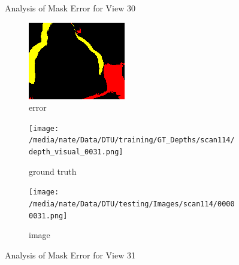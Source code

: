 \documentclass{article}
\begin{document}
\begin{figure}
\begin{subfigure}{0.3\textwidth}
		\label{fig:img30}
	\end{subfigure}
	\hfill
	\caption{Analysis of Mask Error for View 30}
	\label{fig:error_analys30}
\end{figure}\begin{figure}
	\centering
	\begin{subfigure}{0.3\textwidth}
		\centering
		\includegraphics[width=\textwidth]{./output/031_error.png}
		\caption{error}
		\label{fig:error31}
	\end{subfigure}
	\hfill
	\centering
	\begin{subfigure}{0.3\textwidth}
		\centering
		\texttt{[image: /media/nate/Data/DTU/training/GT\_Depths/scan114/depth\_visual\_0031.png]}
		\caption{ground truth}
		\label{fig:gt31}
	\end{subfigure}
	\hfill
	\centering
	\begin{subfigure}{0.3\textwidth}
		\centering
		\texttt{[image: /media/nate/Data/DTU/testing/Images/scan114/00000031.png]}
		\caption{image}
		\label{fig:img31}
	\end{subfigure}
	\hfill
	\caption{Analysis of Mask Error for View 31}
	\label{fig:error_analys31}
\end{figure}\begin{figure}
	\centering
	\begin{subfigure}{0.3\textwidth}
		\centering

\end{subfigure}
\end{figure}
\end{document}

